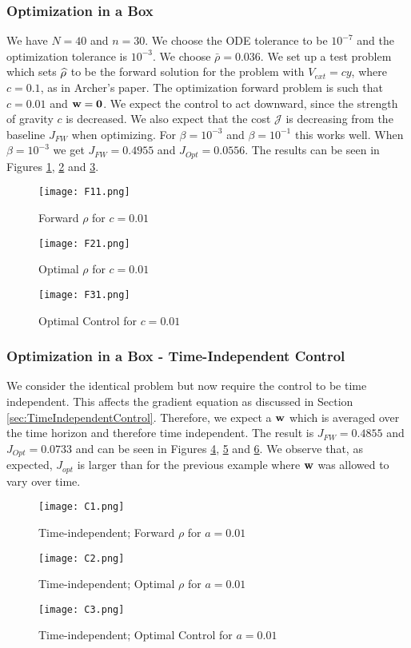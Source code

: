 \subsubsection{Optimization in a Box}
We have $N = 40$ and $n = 30$. We choose the ODE tolerance to be $10^{-7}$ and the optimization tolerance is $10^{-3}$. We choose $\bar \rho = 0.036$.
We set up a test problem which sets $\widehat \rho$ to be the forward solution for the problem with $V_{ext} = cy$, where $c = 0.1$, as in Archer's paper. The optimization forward problem is such that $c = 0.01$ and $\mathbf{w} = \mathbf 0$. We expect the control to act downward, since the strength of gravity $c$ is decreased.
We also expect that the cost $\mathcal J$ is decreasing from the baseline $J_{FW}$ when optimizing.
For $\beta = 10^{-3}$ and $\beta = 10^{-1}$ this works well.
When $\beta = 10^{-3}$ we get $J_{FW} = 0.4955$ and $J_{Opt} = 0.0556 $. 
The results can be seen in Figures \ref{Fa1}, \ref{Fa2} and \ref{Fa3}.
\begin{figure}[h]
	\centering
	\texttt{[image: F11.png]}
	\caption{Forward $\rho$ for $c = 0.01$} 
	\label{Fa1}
\end{figure}	
\begin{figure}[h]
	\centering
	\texttt{[image: F21.png]}
	\caption{Optimal $\rho$ for $c = 0.01$} 
	\label{Fa2}
\end{figure}
\begin{figure}[h]
	\centering
	\texttt{[image: F31.png]}
	\caption{Optimal Control for $c = 0.01$} 
	\label{Fa3}
\end{figure}



\subsubsection{Optimization in a Box - Time-Independent Control}
We consider the identical problem but now require the control to be time independent. This affects the gradient equation as discussed in Section \ref{sec:TimeIndependentControl}.
Therefore, we expect a $\mathbf{w}$ which is averaged over the time horizon and therefore time independent. The result is $J_{FW} = 0.4855$ and $J_{Opt} = 0.0733$ and can be seen in Figures \ref{F6a}, \ref{F7a} and \ref{F8a}. We observe that, as expected, $J_{opt}$ is larger than for the previous example where $\mathbf{w}$ was allowed to vary over time.

\begin{figure}[h]
	\centering
	\texttt{[image: C1.png]}
	\caption{Time-independent; Forward $\rho$ for $a = 0.01$} 
	\label{F6a}
\end{figure}	
\begin{figure}[h]
	\centering
	\texttt{[image: C2.png]}
	\caption{Time-independent; Optimal $\rho$ for $a = 0.01$} 
	\label{F7a}
\end{figure}
\begin{figure}[h]
	\centering
	\texttt{[image: C3.png]}
	\caption{Time-independent; Optimal Control for $a = 0.01$} 
	\label{F8a}
\end{figure}

